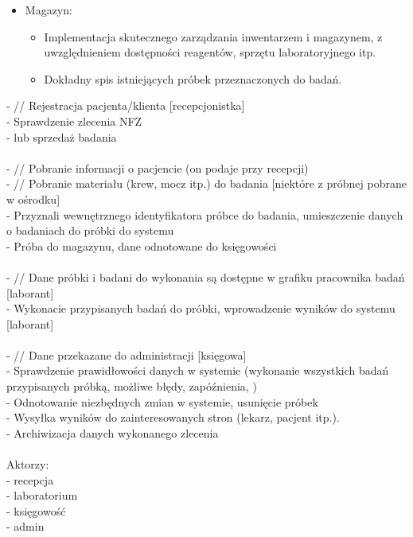 \documentclass[12pt,a4paper]{article}
\begin{document}
\begin{itemize}
\item Magazyn:
    \begin{itemize}
    \item Implementacja skutecznego zarządzania inwentarzem i magazynem, z uwzględnieniem dostępności reagentów, sprzętu laboratoryjnego itp.
    \item Dokładny spis istniejących próbek przeznaczonych do badań.
    \end{itemize}


\end{itemize}



- // Rejestracja pacjenta/klienta [recepcjonistka] \\
 - Sprawdzenie zlecenia NFZ \\
 - lub sprzedaż badania \\
\\
- // Pobranie informacji o pacjencie (on podaje przy recepcji)\\
 - // Pobranie materiału (krew, mocz itp.) do badania [niektóre z próbnej pobrane w ośrodku]\\
 - Przyznali wewnętrznego identyfikatora próbce do badania, umieszczenie danych o badaniach do próbki do systemu\\
 -  Próba do magazynu, dane odnotowane do księgowości \\
 \\
- // Dane próbki i badani do wykonania są dostępne w grafiku pracownika  badań [laborant] \\
- Wykonacie przypisanych badań do próbki, wprowadzenie wyników do systemu [laborant] \\
\\
- // Dane przekazane do administracji [księgowa]\\
- Sprawdzenie prawidłowości danych w systemie (wykonanie wszystkich badań przypisanych próbką, możliwe błędy, zapóźnienia, ) \\
- Odnotowanie niezbędnych zmian w systemie, usunięcie próbek \\
- Wysyłka wyników do zainteresowanych stron (lekarz, pacjent itp.).\\
- Archiwizacja danych wykonanego zlecenia \\
\\
 Aktorzy:\\
 - recepcja\\
 - laboratorium\\
 - księgowość\\
 - admin\\
\end{document}
